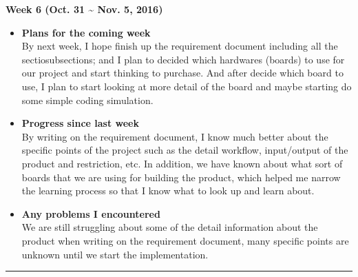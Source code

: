 		\begin{center}
			\textbf{Week 6 (Oct. 31 {\textasciitilde{}} Nov. 5, 2016)}
		\end{center}
		\begin{itemize}
			\item \textbf{Plans for the coming week}
			\\By next week, I hope finish up the requirement document including all the sectiosubsections; and I plan to decided which hardwares (boards) to use for our project and start thinking to purchase. And after decide which board to use, I plan to start looking at more detail of the board and maybe starting do some simple coding simulation.\\

			\item \textbf{Progress since last week}
			\\By writing on the requirement document, I know much better about the specific points of the project such as the detail workflow, input/output of the product and restriction, etc. In addition, we have known about what sort of boards that we are using for building the product, which helped me narrow the learning process so that I know what to look up and learn about.\\

			\item \textbf{Any problems I encountered}
			\\We are still struggling about some of the detail information about the product when writing on the requirement document, many specific points are unknown until we start the implementation.\\
		\end{itemize}

		\rule{\textwidth}{0.5pt}

